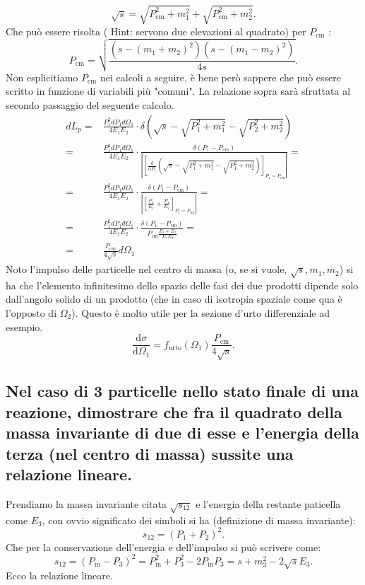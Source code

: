 \[
	\sqrt{s}= \sqrt{P_{\text{cm}}^2 + m_1^2} + \sqrt{ P_{\text{cm}}^2 + m_2^2} 
.\] 
Che può essere risolta ( Hint: servono due elevazioni al quadrato) per $P_{\text{cm}}$ :
\[
	P_{\text{cm}} = \sqrt{\frac{\left( s - \left( m_1+m_2 \right)^2 \right) \left( s - \left( m_1 - m_2 \right)^2 \right)}{4s}} 
.\]
Non esplicitiamo $P_{\text{cm}}$ nei calcoli a seguire, è bene però sappere che può essere scritto in funzione di variabili più "comuni". La relazione sopra sarà sfruttata al secondo passaggio del seguente calcolo.
\begin{align*}
	dL_p =& \frac{P_1^2 dP_1 d \Omega_1}{4E_1E_2} \cdot \delta\left( \sqrt{s} - \sqrt{P_1^2 + m_1^2} - \sqrt{P_2^2 + m_2^2}  \right) \\
	=& \frac{P_1^2 dP_1 d \Omega_1}{4E_1E_2} \cdot 
	\frac{\delta\left(P_1-P_{\text{cm}}\right)}{\left|\left[\frac{\mbox{d}}{\mbox{d}P_1}\left(\sqrt{s}-\sqrt{P_1^2+m_1^2}-\sqrt{P_1^2+m_2^2}\right)\right]_{P_1=P_{\text{cm}}}\right|} = \\
	=& \frac{P_1^2 dP_1 d \Omega_1}{4E_1E_2} \cdot \frac{ \delta \left( P_1-P_{\text{cm}} \right) }{ \left| \left[ \frac{P_1}{E_1}+\frac{P_1}{E_2} \right]_{P_1=P_{\text{cm}}} \right|}=\\
	=& \frac{P_1^2 dP_1 d \Omega_1}{4E_1E_2} \cdot \frac{\delta\left(P_1-P_{\text{cm}}\right)}{P_{\text{cm}} \frac{E_1 + E_2}{E_1E_2}} = \\
	=& \frac{P_{\text{cm}} }{4\sqrt{s}} d\Omega_{1}
\end{align*}
Noto l'impulso delle particelle nel centro di massa (o, se si vuole, $\sqrt{s}, m_1, m_2$) si ha che l'elemento infinitesimo dello spazio delle fasi dei due prodotti dipende solo dall'angolo solido di un prodotto (che in caso di isotropia spaziale come qua è l'opposto di $\Omega_2$). Questo è molto utile per la sezione d'urto differenziale ad esempio.
\[
	\frac{\mbox{d} \sigma}{\mbox{d} \Omega_1} = f_{\text{urto}}\left( \Omega_1 \right) \frac{P_{\text{cm}}}{4\sqrt{s} }
.\] 

\subsection[\hspace{2mm} ]{Nel caso di 3 particelle nello stato finale di una reazione, dimostrare che fra il quadrato della massa invariante di due di esse e l'energia della terza (nel centro di massa) sussite una relazione lineare.}
Prendiamo la massa invariante citata $\sqrt{s_{12}}$ e l'energia della restante paticella come $E_3$, con ovvio significato dei simboli si ha (definizione di massa invariante):
\[
	s_{12} = \left( P_1 + P_2 \right)^2
.\] 
Che per la conservazione dell'energia e dell'impulso si può scrivere come:
\[
	s_{12} = \left( P_{\text{in}} - P_3 \right)^2 = P_{\text{in}}^2 + P_3^2 - 2 P_{\text{in}}P_3 =s + m_3^2 - 2 \sqrt{s}E_3 
.\] 
Ecco la relazione lineare.

